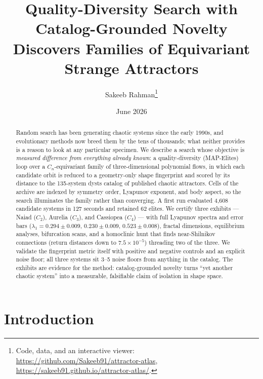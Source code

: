 \documentclass[11pt]{article}
\title{Quality-Diversity Search with Catalog-Grounded Novelty\\
Discovers Families of Equivariant Strange Attractors}
\author{Sakeeb Rahman\thanks{Code, data, and an interactive viewer:
\url{https://github.com/Sakeeb91/attractor-atlas},
\url{https://sakeeb91.github.io/attractor-atlas/}.}}
\date{June 2026}
\begin{document}
\maketitle

\begin{abstract}
Random search has been generating chaotic systems since the early 1990s, and
evolutionary methods now breed them by the tens of thousands; what neither
provides is a reason to look at any particular specimen. We describe a
search whose objective is \emph{measured difference from everything already
known}: a quality-diversity (MAP-Elites) loop over a $C_n$-equivariant
family of three-dimensional polynomial flows, in which each candidate orbit
is reduced to a geometry-only shape fingerprint and scored by its distance
to the 135-system \textsf{dysts} catalog of published chaotic attractors.
Cells of the archive are indexed by symmetry order, Lyapunov exponent, and
body aspect, so the search illuminates the family rather than converging.
A first run evaluated 4{,}608 candidate systems in 127 seconds and retained
62 elites. We certify three exhibits --- Naiad ($C_2$), Aurelia ($C_3$),
and Cassiopea ($C_4$) --- with full Lyapunov spectra and error bars
($\lambda_1 = 0.294\pm0.009$, $0.230\pm0.009$, $0.523\pm0.008$), fractal
dimensions, equilibrium analyses, bifurcation scans, and a homoclinic hunt
that finds near-Shilnikov connections (return distances down to
$7.5\times10^{-5}$) threading two of the three. We validate the fingerprint
metric itself with positive and negative controls and an explicit noise
floor; all three systems sit 3--5 noise floors from anything in the
catalog. The exhibits are evidence for the method: catalog-grounded novelty
turns ``yet another chaotic system'' into a measurable, falsifiable claim
of isolation in shape space.
\end{abstract}

\section{Introduction}\label{sec:intro}
\end{document}
